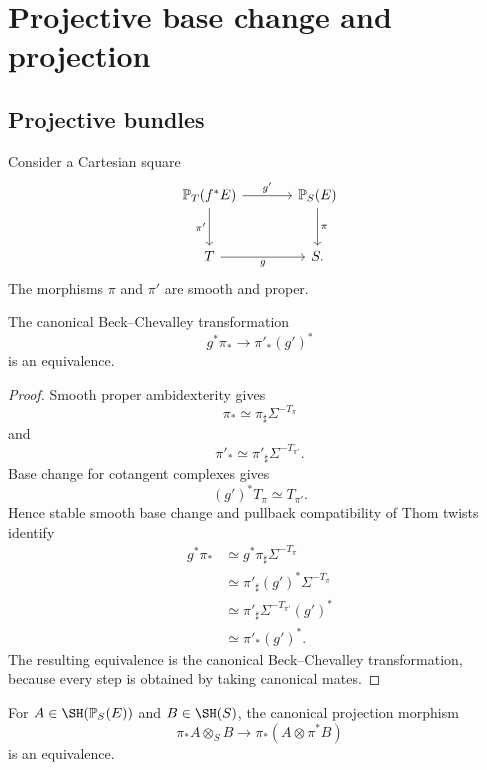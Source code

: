 \section{Projective base change and projection}
\label{sec:projective-exchange}

\subsection{Projective bundles}

Consider a Cartesian square
\[
\begin{tikzcd}[column sep=large,row sep=large]
    \mathbb P_T(f^*E) \arrow[r,"g'"] \arrow[d,"\pi'"']
        & \mathbb P_S(E) \arrow[d,"\pi"] \\
    T \arrow[r,"g"'] & S.
\end{tikzcd}
\]
The morphisms \(\pi\) and \(\pi'\) are smooth and proper.

\begin{theorem}
\label{thm:projective-bundle-base-change}
The canonical Beck--Chevalley transformation
\[
    g^*\pi_*
    \longrightarrow
    \pi'_*(g')^*
\]
is an equivalence.
\end{theorem}

\begin{proof}
Smooth proper ambidexterity gives
\[
    \pi_*
    \simeq
    \pi_\sharp\Sigma^{-T_\pi}
\]
and
\[
    \pi'_*
    \simeq
    \pi'_\sharp\Sigma^{-T_{\pi'}}.
\]
Base change for cotangent complexes gives
\[
    (g')^*T_\pi
    \simeq
    T_{\pi'}.
\]
Hence stable smooth base change and pullback compatibility of Thom twists
identify
\[
\begin{aligned}
    g^*\pi_*
    &\simeq
    g^*\pi_\sharp\Sigma^{-T_\pi} \\
    &\simeq
    \pi'_\sharp(g')^*\Sigma^{-T_\pi} \\
    &\simeq
    \pi'_\sharp\Sigma^{-T_{\pi'}}(g')^* \\
    &\simeq
    \pi'_*(g')^*.
\end{aligned}
\]
The resulting equivalence is the canonical Beck--Chevalley transformation,
because every step is obtained by taking canonical mates.
\end{proof}




\begin{theorem}
\label{thm:projective-bundle-projection}
For \(A\in\SH(\mathbb P_S(E))\) and \(B\in\SH(S)\), the canonical
projection morphism
\[
    \pi_*A\otimes_SB
    \longrightarrow
    \pi_*(A\otimes\pi^*B)
\]
is an equivalence.
\end{theorem}

